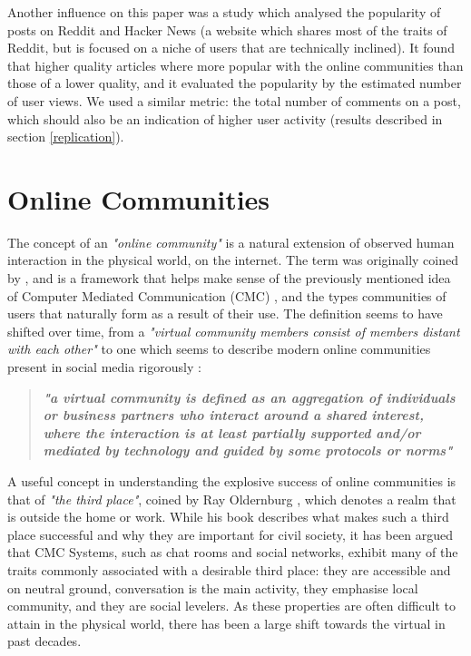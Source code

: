 \documentclass[bsc,frontabs,twoside,singlespacing,parskip,deptreport]{infthesis}
\begin{document}
Another influence on this paper was a study \cite{StoddardGreg2015PaQi} which analysed the popularity of posts on Reddit and Hacker News (a website which shares most of the traits of Reddit, but is focused on a niche of users that are technically inclined). It found that higher quality articles where more popular with the online communities than those of a lower quality, and it evaluated the popularity by the estimated number of user views. We used a similar metric: the total number of comments on a post, which should also be an indication of higher user activity (results described in section \ref{replication}).

\section{Online Communities}\label{online-communities}  
 The concept of an \textit{"online community"} is a natural extension of observed human interaction in the physical world, on the internet. The term was originally coined by \cite{HiltzStarrRoxanne1984Oc:a}, and is a framework that helps make sense of the previously mentioned idea of Computer Mediated Communication (CMC) \cite{HerringSusanC2004STtO}, and the types communities of users that naturally form as a result of their use. The definition seems to have shifted over time, from a \textit{"virtual community members consist of members distant with each other"} \cite{masters}\cite{RheingoldHoward1994Tvc:} to one which seems to describe modern online communities present in social media rigorously \cite{PorterConstanceElise2004AToV}: \\
 
\begin{quotation}
\textbf{\textit{"a virtual community is defined as an aggregation of individuals or business partners who interact around a shared interest, where the interaction is at least partially supported and/or mediated by technology and guided by some protocols or norms"}}
\end{quotation}

A useful concept in understanding the explosive success of online communities is that of \textit{"the third place"}, coined by Ray Oldernburg \cite{oldenburg1999the}, which denotes a realm that is outside the home or work. While his book describes what makes such a third place successful and why they are important for civil society, it has been argued \cite{SoukupCharles2006Ccaa} that CMC Systems, such as chat rooms and social networks, exhibit many of the traits commonly associated with a desirable third place: they are accessible and on neutral ground, conversation is the main activity, they emphasise local community, and they are social levelers. As these properties are often difficult to attain in the physical world, there has been a large shift towards the virtual in past decades.
\end{document}
